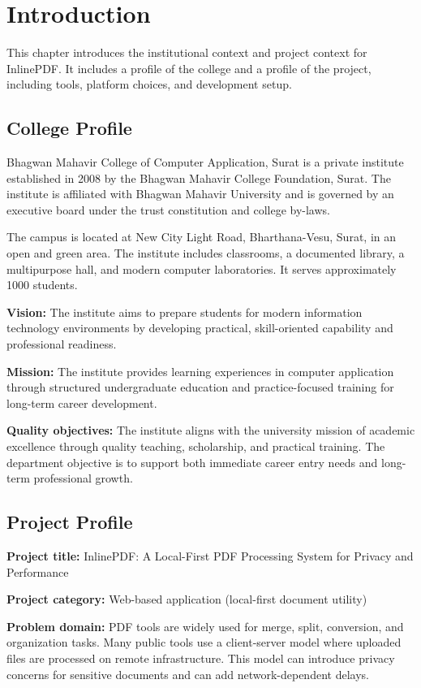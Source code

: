 \section{Introduction}
This chapter introduces the institutional context and project context for InlinePDF. It includes a profile of the college and a profile of the project, including tools, platform choices, and development setup.

\subsection{College Profile}
Bhagwan Mahavir College of Computer Application, Surat is a private institute established in 2008 by the Bhagwan Mahavir College Foundation, Surat. The institute is affiliated with Bhagwan Mahavir University and is governed by an executive board under the trust constitution and college by-laws.

The campus is located at New City Light Road, Bharthana-Vesu, Surat, in an open and green area. The institute includes classrooms, a documented library, a multipurpose hall, and modern computer laboratories. It serves approximately 1000 students.

\textbf{Vision:} The institute aims to prepare students for modern information technology environments by developing practical, skill-oriented capability and professional readiness.

\textbf{Mission:} The institute provides learning experiences in computer application through structured undergraduate education and practice-focused training for long-term career development.

\textbf{Quality objectives:} The institute aligns with the university mission of academic excellence through quality teaching, scholarship, and practical training. The department objective is to support both immediate career entry needs and long-term professional growth.

\subsection{Project Profile}
\textbf{Project title:} InlinePDF: A Local-First PDF Processing System for Privacy and Performance

\textbf{Project category:} Web-based application (local-first document utility)

\textbf{Problem domain:} PDF tools are widely used for merge, split, conversion, and organization tasks. Many public tools use a client-server model where uploaded files are processed on remote infrastructure. This model can introduce privacy concerns for sensitive documents and can add network-dependent delays.

